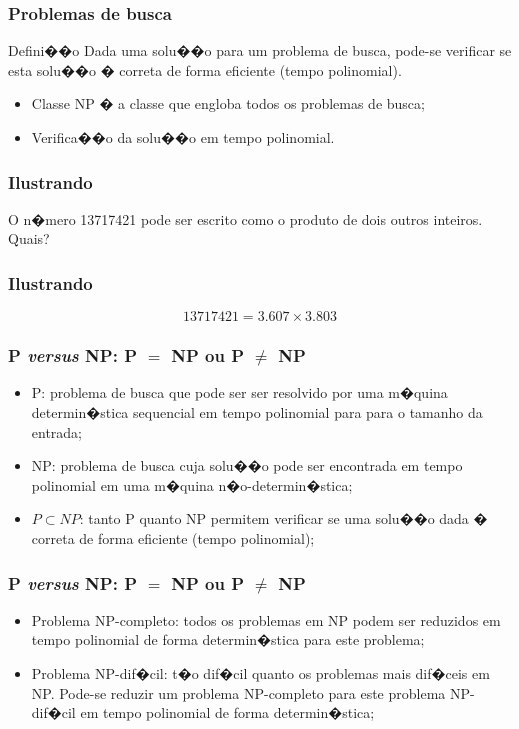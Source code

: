 \documentclass[fleqn]{beamer}
\begin{document}
\begin{frame}
	\frametitle{Problemas de busca}
	\begin{block}{Defini��o}
		Dada uma solu��o para um problema de busca, pode-se verificar se esta solu��o � correta de forma eficiente (tempo polinomial).
	\end{block}
	\begin{itemize}
		\item Classe NP � a classe que engloba todos os problemas de busca;
		\item Verifica��o da solu��o em tempo polinomial.
	\end{itemize}
\end{frame}

\begin{frame}
	\frametitle{Ilustrando}
	O n�mero  13717421 pode ser escrito como o produto de dois outros inteiros. Quais?
\end{frame}
\begin{frame}
	\frametitle{Ilustrando}
	$$
		13717421 = 3.607 \times 3.803
	$$
\end{frame}
\begin{frame}
	\frametitle{P \textit{versus} NP: P $=$ NP ou P $\neq$ NP}
	\begin{itemize}
		\item P: problema de busca que pode ser ser resolvido por uma m�quina determin�stica sequencial em tempo polinomial para para o tamanho da entrada;
		\item NP: problema de busca cuja solu��o pode ser encontrada em tempo polinomial em uma m�quina n�o-determin�stica;
		\item $P \subset NP$: tanto P quanto NP permitem verificar se uma solu��o dada � correta de forma eficiente (tempo polinomial);
	\end{itemize}
\end{frame}
\begin{frame}
	\frametitle{P \textit{versus} NP: P $=$ NP ou P $\neq$ NP}
	\begin{itemize}
		\item Problema NP-completo: todos os problemas em NP podem ser reduzidos em tempo polinomial de forma determin�stica para este problema;
		\item Problema NP-dif�cil: t�o dif�cil quanto os problemas mais dif�ceis em NP. Pode-se reduzir um problema NP-completo para este problema NP-dif�cil em tempo polinomial de forma determin�stica;
	\end{itemize}
\end{frame}
\end{document}
